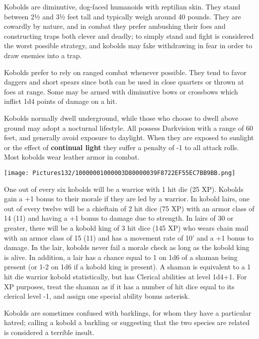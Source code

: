 \documentclass[a4paper,twoside,openany,10pt]{book}
\begin{document}
\begin{multicols}{2}
Kobolds are diminutive, dog-faced humanoids with reptilian skin. They stand between 2½ and 3½ feet tall and typically weigh around 40 pounds. They are cowardly by nature, and in combat they prefer ambushing their foes and constructing traps both clever and deadly; to simply stand and fight is considered the worst possible strategy, and kobolds may fake withdrawing in fear in order to draw enemies into a trap.

Kobolds prefer to rely on ranged combat whenever possible. They tend to favor daggers and short spears since both can be used in close quarters or thrown at foes at range. Some may be armed with diminutive bows or crossbows which inflict 1d4 points of damage on a hit. 

Kobolds normally dwell underground, while those who choose to dwell above ground may adopt a nocturnal lifestyle. All possess Darkvision with a range of 60 feet, and generally avoid exposure to daylight. When they are exposed to sunlight or the effect of \textbf{continual light }they suffer a penalty of -1 to all attack rolls. Most kobolds wear leather armor in combat.\\


\begin{center}
	 \texttt{[image: Pictures132/10000001000003D80000039F8722EF55EC7BB9BB.png]}
\end{center} \medskip

One out of every six kobolds will be a warrior with 1 hit die (25 XP). Kobolds gain a +1 bonus to their morale if they are led by a warrior. In kobold lairs, one out of every twelve will be a chieftain of 2 hit dice (75 XP) with an armor class of 14 (11) and having a +1 bonus to damage due to strength. In lairs of 30 or greater, there will be a kobold king of 3 hit dice (145 XP) who wears chain mail with an armor class of 15 (11) and has a movement rate of 10' and a +1 bonus to damage. In the lair, kobolds never fail a morale check as long as the kobold king is alive. In addition, a lair has a chance equal to 1 on 1d6 of a shaman being present (or 1-2 on 1d6 if a kobold king is present). A shaman is equivalent to a 1 hit die warrior kobold statistically, but has Clerical abilities at level 1d4+1. For XP purposes, treat the shaman as if it has a number of hit dice equal to its clerical level -1, and assign one special ability bonus asterisk.

Kobolds are sometimes confused with barklings, for whom they have a particular hatred; calling a kobold a barkling or suggesting that the two species are related is considered a terrible insult.



\end{multicols}
\end{document}
